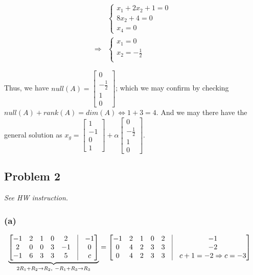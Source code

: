 \documentclass[11pt]{article}
\providecommand{\qbm}[1]{\begin{bmatrix} #1 \end{bmatrix}}
\begin{document}
    \begin{align*}
        &\begin{cases}
            x_1 + 2x_2 + 1  = 0 \\
            8x_2 + 4   = 0 \\
            x_4 = 0
        \end{cases} \\
        \Longrightarrow &\begin{cases}
            x_1 = 0 \\
            x_2 = -\frac{1}{2} \\
        \end{cases}
    \end{align*}

Thus, we have $null(A) = \qbm{0 \\ -\frac{1}{2} \\ 1 \\ 0}$; which we may confirm by checking $null(A) + rank(A) = dim(A) \Longleftrightarrow 1 + 3 = 4$. And we may there have the general solution as $x_g =  \qbm{1 \\ -1 \\ 0 \\ 1} + \alpha \qbm{0 \\ -\frac{1}{2} \\ 1 \\ 0}$.


\subsection*{Problem 2}
\textit{See HW instruction.}\newline

\subsubsection*{(a)}

\begin{align*}
    &\underbrace{\qbm{-1 & 2 & 1 & 0 & 2 & \vline & -1 \\
        2 & 0 & 0 & 3 & -1 & \vline & 0 \\
        -1 & 6 & 3 & 3 & 5 & \vline & c}}_{2R_1 + R_2 \to R_2, \ -R_1 + R_3 \to R_3} =
    \qbm{-1 & 2 & 1 & 0 & 2 & \vline & -1 \\
        0 & 4 & 2 & 3 & 3 & \vline & -2 \\
        0 & 4 & 2 & 3 & 3 & \vline & c + 1 = -2 \Rightarrow c = -3}
\end{align*}
\end{document}
